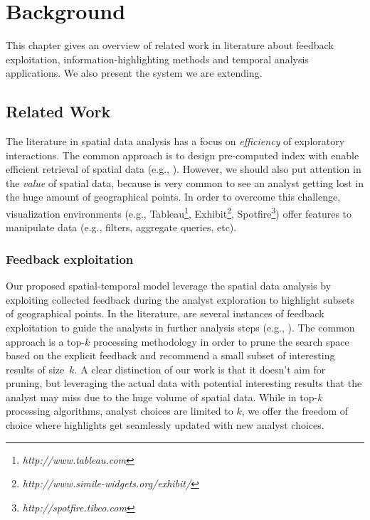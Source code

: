 \chapter{Background}
\label{chap:background}

This chapter gives an overview of related work in literature about feedback exploitation, information-highlighting methods and temporal analysis applications. We also present the system we are extending.

\section{Related Work}

The literature in spatial data analysis has a focus on {\em efficiency} of exploratory interactions. The common approach is to design pre-computed index with enable efficient retrieval of spatial data (e.g., \cite{lins2013nanocubes}). However,
we should also put attention in the {\em value} of spatial data, because is very common to see an analyst getting lost in the huge amount of geographical points. In order to overcome this challenge, visualization environments (e.g., Tableau\footnote{\it http://www.tableau.com}, Exhibit\footnote{\it http://www.simile-widgets.org/exhibit/}, Spotfire\footnote{\it  http://spotfire.tibco.com}) offer features to manipulate data (e.g., filters, aggregate queries, etc).

\subsection{Feedback exploitation}

Our proposed spatial-temporal model leverage the spatial data analysis by exploiting collected feedback during the analyst exploration to highlight subsets of geographical points. In the literature, are several instances of feedback exploitation to guide the analysts in further analysis steps (e.g., ).  The common approach is a top-$k$ processing methodology in order to prune the search space based on the explicit feedback and recommend a small subset of interesting results of size~$k$. A clear distinction of our work is that it doesn't aim for pruning, but leveraging the actual data with potential interesting results that the analyst may miss due to the huge volume of spatial data. While in top-$k$ processing algorithms, analyst choices are limited to $k$, we offer the freedom of choice where highlights get seamlessly updated with new analyst choices.


